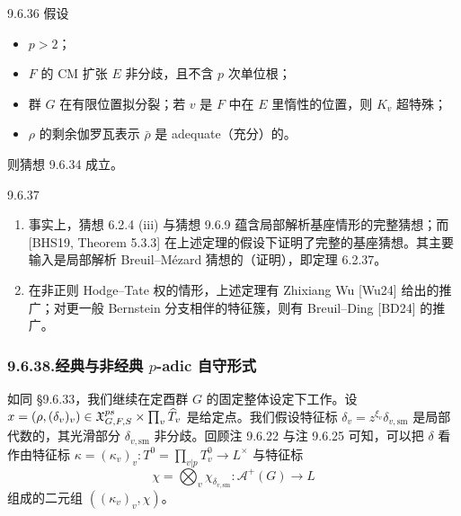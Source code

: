 \begin{thm}{9.6.36}\label{thm:a4-16-9-6-36}
假设
\begin{itemize}
\item $p>2$；
\item $F$ 的 CM 扩张 $E$ 非分歧，且不含 $p$ 次单位根；
\item 群 $G$ 在有限位置拟分裂；若 $v$ 是 $F$ 中在 $E$ 里惰性的位置，则 $K_v$ 超特殊；
\item $\rho$ 的剩余伽罗瓦表示 $\bar\rho$ 是 adequate（充分）的。
\end{itemize}
则猜想 9.6.34 成立。
\end{thm}

\begin{rem}{9.6.37}\label{rem:a4-16-9-6-37}
\begin{enumerate}
\item[(i)] 事实上，猜想 6.2.4 (iii) 与猜想 9.6.9 蕴含局部解析基座情形的完整猜想；而 [BHS19, Theorem 5.3.3] 在上述定理的假设下证明了完整的基座猜想。其主要输入是局部解析 Breuil--Mézard 猜想的（证明），即定理 6.2.37。
\item[(ii)] 在非正则 Hodge--Tate 权的情形，上述定理有 Zhixiang Wu [Wu24] 给出的推广；对更一般 Bernstein 分支相伴的特征簇，则有 Breuil--Ding [BD24] 的推广。
\end{enumerate}
\end{rem}

\subsubsection*{9.6.38.\quad 经典与非经典 $p$-adic 自守形式}

如同 §9.6.33，我们继续在定酉群 $G$ 的固定整体设定下工作。设 $x=(\rho,(\delta_v)_v)\in\mathfrak X^{ps}_{G,F,S}\times\prod_v\widehat T_v$ 是给定点。我们假设特征标 $\delta_v=z^{\xi_v}\delta_{v,\mathrm{sm}}$ 是局部代数的，其光滑部分 $\delta_{v,\mathrm{sm}}$ 非分歧。回顾注 9.6.22 与注 9.6.25 可知，可以把 $\delta$ 看作由特征标 $\kappa=(\kappa_v)_v:T^0=\prod_{v|p}T_v^0\to L^\times$ 与特征标
\[
\chi=\bigotimes_v\chi_{\delta_{v,\mathrm{sm}}}:\mathcal A^+(G)\to L
\]
组成的二元组 $((\kappa_v)_v,\chi)$。

